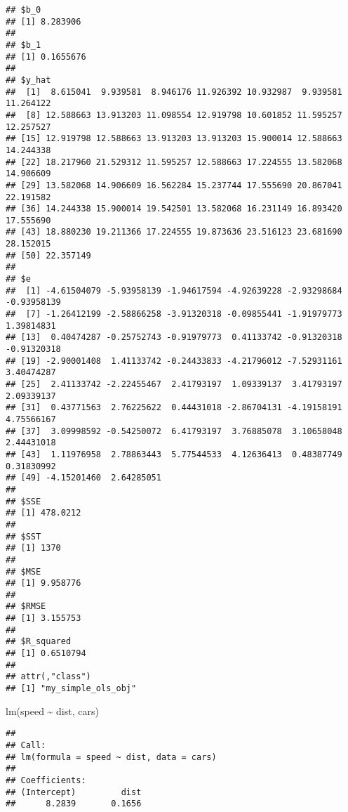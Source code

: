 \documentclass[
]{article}
\newenvironment{Shaded}{\begin{snugshade}}{\end{snugshade}}
\newcommand{\FunctionTok}[1]{\textcolor[rgb]{0.00,0.00,0.00}{#1}}
\newcommand{\NormalTok}[1]{#1}
\newcommand{\SpecialCharTok}[1]{\textcolor[rgb]{0.00,0.00,0.00}{#1}}
\begin{document}
\begin{Shaded}
\end{Shaded}

\begin{verbatim}
## $b_0
## [1] 8.283906
## 
## $b_1
## [1] 0.1655676
## 
## $y_hat
##  [1]  8.615041  9.939581  8.946176 11.926392 10.932987  9.939581 11.264122
##  [8] 12.588663 13.913203 11.098554 12.919798 10.601852 11.595257 12.257527
## [15] 12.919798 12.588663 13.913203 13.913203 15.900014 12.588663 14.244338
## [22] 18.217960 21.529312 11.595257 12.588663 17.224555 13.582068 14.906609
## [29] 13.582068 14.906609 16.562284 15.237744 17.555690 20.867041 22.191582
## [36] 14.244338 15.900014 19.542501 13.582068 16.231149 16.893420 17.555690
## [43] 18.880230 19.211366 17.224555 19.873636 23.516123 23.681690 28.152015
## [50] 22.357149
## 
## $e
##  [1] -4.61504079 -5.93958139 -1.94617594 -4.92639228 -2.93298684 -0.93958139
##  [7] -1.26412199 -2.58866258 -3.91320318 -0.09855441 -1.91979773  1.39814831
## [13]  0.40474287 -0.25752743 -0.91979773  0.41133742 -0.91320318 -0.91320318
## [19] -2.90001408  1.41133742 -0.24433833 -4.21796012 -7.52931161  3.40474287
## [25]  2.41133742 -2.22455467  2.41793197  1.09339137  3.41793197  2.09339137
## [31]  0.43771563  2.76225622  0.44431018 -2.86704131 -4.19158191  4.75566167
## [37]  3.09998592 -0.54250072  6.41793197  3.76885078  3.10658048  2.44431018
## [43]  1.11976958  2.78863443  5.77544533  4.12636413  0.48387749  0.31830992
## [49] -4.15201460  2.64285051
## 
## $SSE
## [1] 478.0212
## 
## $SST
## [1] 1370
## 
## $MSE
## [1] 9.958776
## 
## $RMSE
## [1] 3.155753
## 
## $R_squared
## [1] 0.6510794
## 
## attr(,"class")
## [1] "my_simple_ols_obj"
\end{verbatim}

\begin{Shaded}
\begin{Highlighting}[]
\FunctionTok{lm}\NormalTok{(speed }\SpecialCharTok{\textasciitilde{}}\NormalTok{ dist, cars)}
\end{Highlighting}
\end{Shaded}

\begin{verbatim}
## 
## Call:
## lm(formula = speed ~ dist, data = cars)
## 
## Coefficients:
## (Intercept)         dist  
##      8.2839       0.1656
\end{verbatim}
\end{document}
